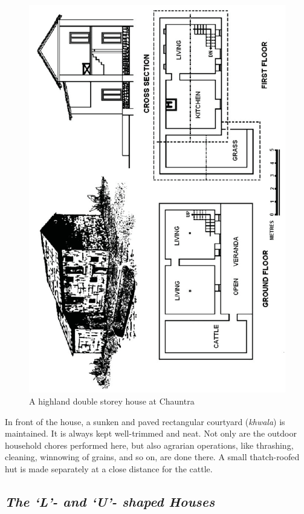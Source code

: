 \begin{figure}[!htbp]
\includegraphics[scale=.85]{images/chap02-07.jpg}
\caption{A highland double storey house at Chauntra}\label{chap02-fig07}
\end{figure}

In front of the house, a sunken and paved rectangular courtyard (\textit{khwala}) is maintained. It is always kept well-trimmed and neat. Not only are the outdoor household chores performed here, but also agrarian operations, like thrashing, cleaning, winnowing of grains, and so on, are done there. A small thatch-roofed hut is made separately at a close distance for the cattle.


\subsection*{\textit{The ‘L’- and ‘U’- shaped Houses}}

